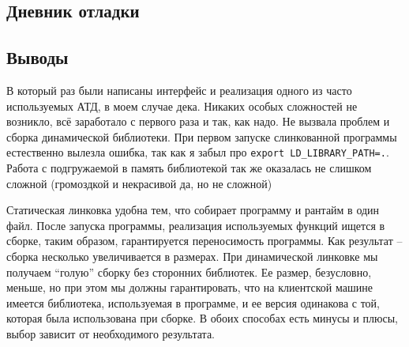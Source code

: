 \documentclass[12pt]{article}
\begin{document}
\subsection*{Дневник отладки}  


\subsection*{Выводы}



В который раз были написаны интерфейс и реализация одного из часто используемых АТД, в моем случае дека. Никаких особых сложностей не возникло, всё заработало с первого раза и так, как надо. Не вызвала проблем и сборка динамической библиотеки. При первом запуске слинкованной программы естественно вылезла ошибка, так как я забыл про  \lstinline|export LD_LIBRARY_PATH=.|. Работа с подгружаемой в память библиотекой так же оказалась не слишком сложной (громоздкой и некрасивой да, но не сложной)

Статическая линковка удобна тем, что собирает программу и рантайм в один файл. После запуска программы, реализация используемых функций ищется в сборке, таким образом, гарантируется переносимость программы. Как результат -- сборка несколько увеличивается в размерах. При динамической линковке мы получаем ``голую'' сборку без сторонних библиотек. Ее размер, безусловно, меньше, но при этом мы должны гарантировать, что на клиентской машине имеется библиотека, используемая в программе, и ее версия одинакова с той, которая была использована при сборке. В обоих способах есть минусы и плюсы, выбор зависит от необходимого результата.
\end{document}
